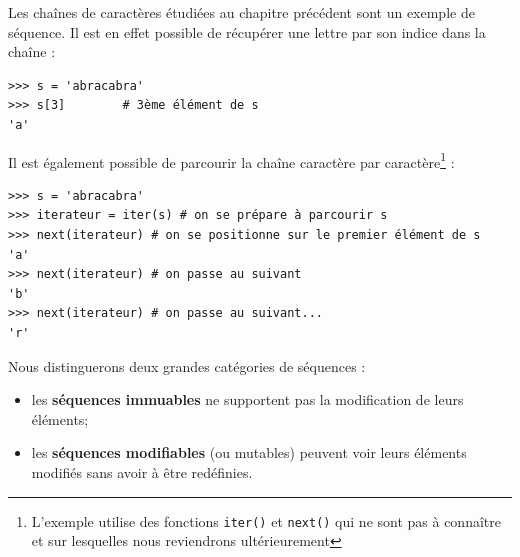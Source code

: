 \documentclass[12pt, a4paper]{article}
\begin{document}
Les chaînes de caractères étudiées au chapitre précédent sont un exemple de séquence. Il est en effet possible de récupérer une lettre par son indice dans la chaîne :
\begin{lstlisting}
>>> s = 'abracabra'
>>> s[3]		# 3ème élément de s
'a'
\end{lstlisting}

Il est également possible de parcourir la chaîne caractère par caractère\footnote{L'exemple utilise des fonctions \lstinline{iter()} et \lstinline{next()} qui ne sont pas à connaître et sur lesquelles nous reviendrons ultérieurement} :
\begin{lstlisting}
>>> s = 'abracabra'
>>> iterateur = iter(s)	# on se prépare à parcourir s
>>> next(iterateur)	# on se positionne sur le premier élément de s
'a'
>>> next(iterateur)	# on passe au suivant
'b'
>>> next(iterateur)	# on passe au suivant...
'r'
\end{lstlisting}

Nous distinguerons deux grandes catégories de séquences :
\begin{itemize}
	\item les \textbf{séquences immuables} ne supportent pas la modification de leurs éléments;
	\item les \textbf{séquences modifiables} (ou mutables) peuvent voir leurs éléments modifiés sans avoir à être redéfinies.
\end{itemize}
\end{document}
